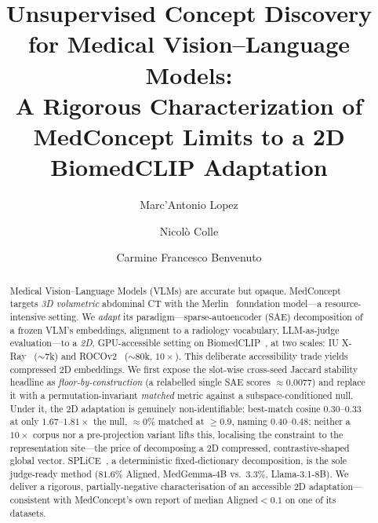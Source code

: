 \documentclass[sigconf, nonacm]{acmart}
\begin{document}
\title{Unsupervised Concept Discovery for Medical Vision--Language Models:\\A Rigorous Characterization of MedConcept Limits to a 2D BiomedCLIP Adaptation}

\author{Marc'Antonio Lopez}

\author{Nicolò Colle}

\author{Carmine Francesco Benvenuto}

\begin{abstract}
Medical Vision--Language Models (VLMs) are accurate but opaque. MedConcept~\cite{haque2026medconcept} targets \emph{3D volumetric} abdominal CT with the Merlin~\cite{blankemeier2024merlin} foundation model---a resource-intensive setting. We \emph{adapt} its paradigm---sparse-autoencoder (SAE) decomposition of a frozen VLM's embeddings, alignment to a radiology vocabulary, LLM-as-judge evaluation---to a \emph{2D}, GPU-accessible setting on BiomedCLIP~\cite{zhang2023biomedclip}, at two scales: IU X-Ray~\cite{demner2016iuxray} (${\sim}7$k) and ROCOv2~\cite{rueckert2024rocov2} (${\sim}80$k, $10{\times}$). This deliberate accessibility trade yields compressed 2D embeddings. We first expose the slot-wise cross-seed Jaccard stability headline as \emph{floor-by-construction} (a relabelled single SAE scores ${\approx}0.0077$) and replace it with a permutation-invariant \emph{matched} metric against a subspace-conditioned null. Under it, the 2D adaptation is genuinely non-identifiable: best-match cosine $0.30$--$0.33$ at only $1.67$--$1.81{\times}$ the null, ${\approx}0\%$ matched at ${\geq}0.9$, naming $0.40$--$0.48$; neither a $10{\times}$ corpus nor a pre-projection variant lifts this, localising the constraint to the representation site---the price of decomposing a 2D compressed, contrastive-shaped global vector. SPLiCE~\cite{bhalla2024spliece}, a deterministic fixed-dictionary decomposition, is the sole judge-ready method ($81.6\%$ Aligned, MedGemma-4B vs.\ $3.3\%$, Llama-3.1-8B). We deliver a rigorous, partially-negative characterisation of an accessible 2D adaptation---consistent with MedConcept's own report of median Aligned$<0.1$ on one of its datasets.
\end{abstract}

\end{document}
